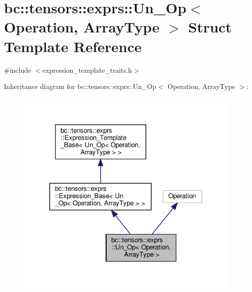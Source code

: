 \hypertarget{structbc_1_1tensors_1_1exprs_1_1Un__Op}{}\section{bc\+:\+:tensors\+:\+:exprs\+:\+:Un\+\_\+\+Op$<$ Operation, Array\+Type $>$ Struct Template Reference}
\label{structbc_1_1tensors_1_1exprs_1_1Un__Op}


{\ttfamily \#include $<$expression\+\_\+template\+\_\+traits.\+h$>$}



Inheritance diagram for bc\+:\+:tensors\+:\+:exprs\+:\+:Un\+\_\+\+Op$<$ Operation, Array\+Type $>$\+:\nopagebreak
\begin{figure}[H]
\begin{center}
\leavevmode
\includegraphics[width=312pt]{structbc_1_1tensors_1_1exprs_1_1Un__Op__inherit__graph}
\end{center}
\end{figure}


